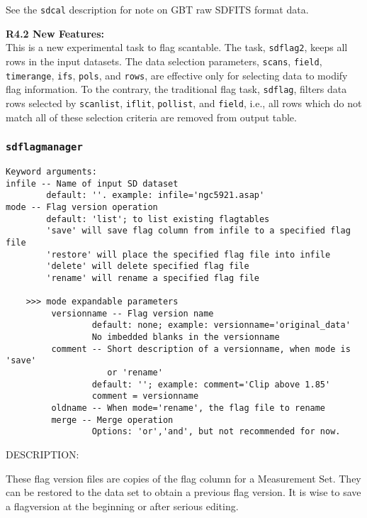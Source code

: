 See the {\tt sdcal} description for note on GBT raw SDFITS format data.


\medskip
{\bf R4.2 New Features:}\\
This is a new experimental task to flag scantable. 
The task, {\tt sdflag2}, keeps all rows in the input datasets.
The data selection parameters, {\tt scans}, {\tt field},
{\tt timerange}, {\tt ifs}, {\tt pols}, and {\tt rows},
are effective only for selecting data to modify flag information.
To the contrary, the traditional flag task, {\tt sdflag},
filters data rows selected by {\tt scanlist}, {\tt iflit},
{\tt pollist}, and {\tt field}, i.e., 
all rows which do not match all of these selection criteria are
removed from output table.


\subsubsection{{\tt sdflagmanager}}
\label{section:sd.sdtasks.tasks.sdflagmanager}

\begin{verbatim}
Keyword arguments:
infile -- Name of input SD dataset
        default: ''. example: infile='ngc5921.asap'
mode -- Flag version operation
        default: 'list'; to list existing flagtables
        'save' will save flag column from infile to a specified flag file
        'restore' will place the specified flag file into infile
        'delete' will delete specified flag file
        'rename' will rename a specified flag file

    >>> mode expandable parameters             
         versionname -- Flag version name
                 default: none; example: versionname='original_data'
                 No imbedded blanks in the versionname
         comment -- Short description of a versionname, when mode is 'save' 
                    or 'rename'
                 default: ''; example: comment='Clip above 1.85'
                 comment = versionname
         oldname -- When mode='rename', the flag file to rename
         merge -- Merge operation
                 Options: 'or','and', but not recommended for now.

\end{verbatim}

DESCRIPTION:

These flag version files are copies of the flag column for a
Measurement Set.  They can be restored to the data set to obtain
a previous flag version.  It is wise to
save a flagversion at the beginning or after serious editing.    



